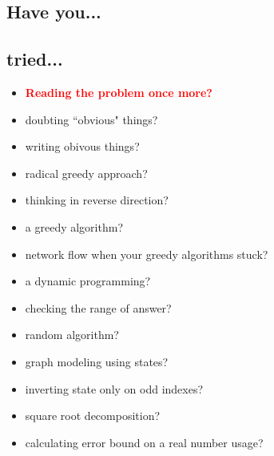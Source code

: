\documentclass[landscape, 8pt, a4paper, oneside]{extarticle}
\begin{document}
\begin{multicols}{3}
\maketitlepage


\section{Have you...}

\subsection{tried...}

\begin{itemize}
    \item \textcolor{red}{\textbf{Reading the problem once more?}}
    \item doubting ``obvious" things?
    \item writing obivous things?
    \item radical greedy approach?
    \item thinking in reverse direction?
    \item a greedy algorithm?
    \item network flow when your greedy algorithms stuck?
    \item a dynamic programming?
    \item checking the range of answer?
    \item random algorithm?
    \item graph modeling using states?
    \item inverting state only on odd indexes?
    \item square root decomposition?
    \item calculating error bound on a real number usage?
\end{itemize}




\end{multicols}
\end{document}
